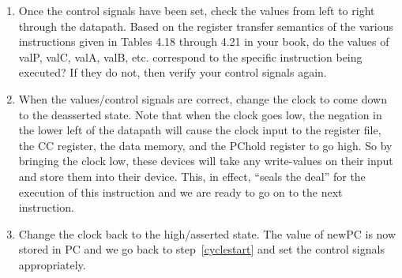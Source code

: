 \documentclass[11pt]{article}
\begin{document}
\begin{enumerate}


\item Once the control signals have been set, check the values from left to right through the datapath.  Based on the register transfer semantics of the various instructions given in Tables 4.18 through 4.21 in your book, do the values of valP, valC, valA, valB, etc. correspond to the specific instruction being executed?  If they do not, then verify your control signals again.
\item When the values/control signals are correct, change the clock to come down to the deasserted state.  Note that when the clock goes low, the negation in the lower left of the datapath will cause the clock input to the register file, the CC register, the data memory, and the PChold register to go high.  So by bringing the clock low, these devices will take any write-values on their input and store them into their device.  This, in effect, ``seals the deal'' for the execution of this instruction and we are ready to go on to the next instruction.
\item Change the clock back to the high/asserted state.  The value of newPC is now stored in PC and we go back to step~\ref{cyclestart} and set the control signals appropriately.
\end{enumerate}
\end{document}
